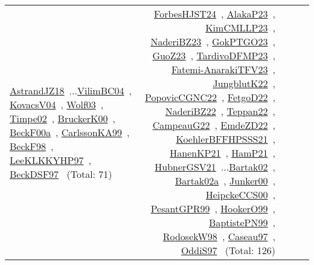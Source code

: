 {\begin{longtable}{p{3cm}r>{\raggedright\arraybackslash}p{6cm}>{\raggedright\arraybackslash}p{6cm}>{\raggedright\arraybackslash}p{8cm}}
\href{../works/AstrandJZ18.pdf}{AstrandJZ18}~\cite{AstrandJZ18}...\href{../works/VilimBC04.pdf}{VilimBC04}~\cite{VilimBC04}, \href{../works/KovacsV04.pdf}{KovacsV04}~\cite{KovacsV04}, \href{../works/Wolf03.pdf}{Wolf03}~\cite{Wolf03}, \href{../works/Timpe02.pdf}{Timpe02}~\cite{Timpe02}, \href{../works/BruckerK00.pdf}{BruckerK00}~\cite{BruckerK00}, \href{../works/BeckF00a.pdf}{BeckF00a}~\cite{BeckF00a}, \href{../works/CarlssonKA99.pdf}{CarlssonKA99}~\cite{CarlssonKA99}, \href{../works/BeckF98.pdf}{BeckF98}~\cite{BeckF98}, \href{../works/LeeKLKKYHP97.pdf}{LeeKLKKYHP97}~\cite{LeeKLKKYHP97}, \href{../works/BeckDSF97.pdf}{BeckDSF97}~\cite{BeckDSF97} (Total: 71) & \href{../works/ForbesHJST24.pdf}{ForbesHJST24}~\cite{ForbesHJST24}, \href{../works/AlakaP23.pdf}{AlakaP23}~\cite{AlakaP23}, \href{../works/KimCMLLP23.pdf}{KimCMLLP23}~\cite{KimCMLLP23}, \href{../works/NaderiBZ23.pdf}{NaderiBZ23}~\cite{NaderiBZ23}, \href{../works/GokPTGO23.pdf}{GokPTGO23}~\cite{GokPTGO23}, \href{../works/GuoZ23.pdf}{GuoZ23}~\cite{GuoZ23}, \href{../works/TardivoDFMP23.pdf}{TardivoDFMP23}~\cite{TardivoDFMP23}, \href{../works/Fatemi-AnarakiTFV23.pdf}{Fatemi-AnarakiTFV23}~\cite{Fatemi-AnarakiTFV23}, \href{../works/JungblutK22.pdf}{JungblutK22}~\cite{JungblutK22}, \href{../works/PopovicCGNC22.pdf}{PopovicCGNC22}~\cite{PopovicCGNC22}, \href{../works/FetgoD22.pdf}{FetgoD22}~\cite{FetgoD22}, \href{../works/NaderiBZ22.pdf}{NaderiBZ22}~\cite{NaderiBZ22}, \href{../works/Teppan22.pdf}{Teppan22}~\cite{Teppan22}, \href{../works/CampeauG22.pdf}{CampeauG22}~\cite{CampeauG22}, \href{../works/EmdeZD22.pdf}{EmdeZD22}~\cite{EmdeZD22}, \href{../works/KoehlerBFFHPSSS21.pdf}{KoehlerBFFHPSSS21}~\cite{KoehlerBFFHPSSS21}, \href{../works/HanenKP21.pdf}{HanenKP21}~\cite{HanenKP21}, \href{../works/HamP21.pdf}{HamP21}~\cite{HamP21}, \href{../works/HubnerGSV21.pdf}{HubnerGSV21}~\cite{HubnerGSV21}...\href{../works/Bartak02.pdf}{Bartak02}~\cite{Bartak02}, \href{../works/Bartak02a.pdf}{Bartak02a}~\cite{Bartak02a}, \href{../works/Junker00.pdf}{Junker00}~\cite{Junker00}, \href{../works/HeipckeCCS00.pdf}{HeipckeCCS00}~\cite{HeipckeCCS00}, \href{../works/PesantGPR99.pdf}{PesantGPR99}~\cite{PesantGPR99}, \href{../works/HookerO99.pdf}{HookerO99}~\cite{HookerO99}, \href{../works/BaptistePN99.pdf}{BaptistePN99}~\cite{BaptistePN99}, \href{../works/RodosekW98.pdf}{RodosekW98}~\cite{RodosekW98}, \href{../works/Caseau97.pdf}{Caseau97}~\cite{Caseau97}, \href{../works/OddiS97.pdf}{OddiS97}~\cite{OddiS97} (Total: 126)\\

\end{longtable}}
